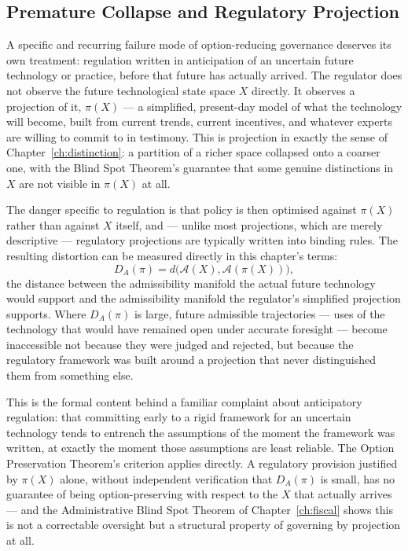 \documentclass[12pt,twoside,openright]{book}
\newcommand{\adm}{\mathcal{A}}
\begin{document}
\subsection{Premature Collapse and Regulatory Projection}
\label{sec:ch28-projection}

A specific and recurring failure mode of option-reducing
governance deserves its own treatment: regulation written in
anticipation of an uncertain future technology or practice,
before that future has actually arrived. The regulator does
not observe the future technological state space $X$
directly. It observes a projection of it, $\pi(X)$ ---
a simplified, present-day model of what the technology will
become, built from current trends, current incentives, and
whatever experts are willing to commit to in testimony. This
is projection in exactly the sense of
Chapter~\ref{ch:distinction}: a partition of a richer space
collapsed onto a coarser one, with the Blind Spot Theorem's
guarantee that some genuine distinctions in $X$ are not
visible in $\pi(X)$ at all.

The danger specific to regulation is that policy is then
optimised against $\pi(X)$ rather than against $X$ itself,
and --- unlike most projections, which are merely descriptive
--- regulatory projections are typically written into binding
rules. The resulting distortion can be measured directly in
this chapter's terms:
\[
  D_A(\pi)
  = d\bigl(\adm(X), \adm(\pi(X))\bigr),
\]
the distance between the admissibility manifold the actual
future technology would support and the admissibility
manifold the regulator's simplified projection supports.
Where $D_A(\pi)$ is large, future admissible trajectories ---
uses of the technology that would have remained open under
accurate foresight --- become inaccessible not because they
were judged and rejected, but because the regulatory
framework was built around a projection that never
distinguished them from something else.

This is the formal content behind a familiar complaint about
anticipatory regulation: that committing early to a rigid
framework for an uncertain technology tends to entrench the
assumptions of the moment the framework was written, at
exactly the moment those assumptions are least reliable. The
Option Preservation Theorem's criterion applies directly.
A regulatory provision justified by $\pi(X)$ alone, without
independent verification that $D_A(\pi)$ is small, has no
guarantee of being option-preserving with respect to the $X$
that actually arrives --- and the Administrative Blind Spot
Theorem of Chapter~\ref{ch:fiscal} shows this is not a
correctable oversight but a structural property of governing
by projection at all.
\end{document}
